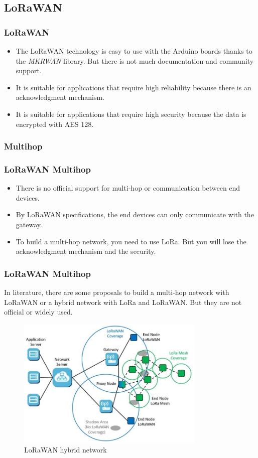 \documentclass{beamer}
\begin{document}
\subsection{LoRaWAN}
\begin{frame}
    \frametitle{LoRaWAN}
    \begin{itemize}[<+->]
        \item The LoRaWAN technology is easy to use with the Arduino boards thanks to the
              \emph{MKRWAN} library. But there is not much documentation and community
              support.
        \item It is suitable for applications that require high reliability because there is
              an acknowledgment mechanism.
        \item It is suitable for applications that require high security because the data is
              encrypted with AES 128.
    \end{itemize}
\end{frame}

\subsubsection{Multihop}
\begin{frame}
    \frametitle{LoRaWAN Multihop}
    \begin{itemize}[<+->]
        \item There is no official support for multi-hop or communication between end
              devices.
        \item By LoRaWAN specifications, the end devices can only communicate with the
              gateway.
        \item To build a multi-hop network, you need to use LoRa. But you will lose the
              acknowledgment mechanism and the security.
    \end{itemize}
\end{frame}

\begin{frame}
    \frametitle{LoRaWAN Multihop}
    In literature, there are some proposals to build a multi-hop network with LoRaWAN or a hybrid network with LoRa and LoRaWAN\@.
    But they are not official or widely used.
    \begin{figure}
        \centering
        \includegraphics[width=0.8\textwidth]{images/lorawan_mesh.png}
        \caption{LoRaWAN hybrid network}
    \end{figure}
\end{frame}
\end{document}
